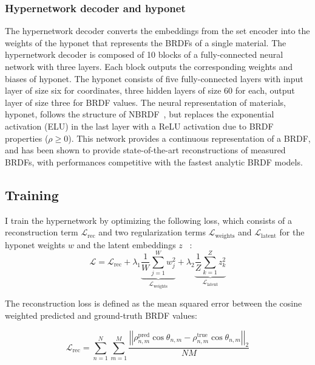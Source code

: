 \subsubsection{Hypernetwork decoder and hyponet} %
The hypernetwork decoder converts the embeddings from the set encoder into the weights of the hyponet that represents the \gls{BRDF}s of a single material. The hypernetwork decoder is composed of 10 blocks of a fully-connected neural network with three layers. Each block outputs the corresponding weights and biases of hyponet. The hyponet consists of five fully-connected layers with input layer of size six for coordinates, three hidden layers of size 60 for each, output layer of size three for \gls{BRDF} values. The neural representation of materials, hyponet, follows the structure of NBRDF~\cite{sztrajman2021neural}, but replaces the exponential activation (\gls{ELU}) in the last layer with a \gls{ReLU} activation due to \gls{BRDF} properties ($\rho \ge 0$). This network provides a continuous representation of a \gls{BRDF}, and has been shown to provide state-of-the-art reconstructions of measured \gls{BRDF}s, with performances competitive with the fastest analytic \gls{BRDF} models.


\subsection{Training}
\label{sec:traindet}


I train the hypernetwork by optimizing the following loss, which consists of a reconstruction term $\mathcal{L}_\text{rec}$ and two regularization terms $\mathcal{L}_\text{weights}$ and $\mathcal{L}_\text{latent}$ for the hyponet weights $w$ and the latent embeddings $z$ ~\cite{ha2017hypernetworks}:
\begin{equation}
    \mathcal{L} = \mathcal{L}_\text{rec} +
              \lambda_1 \underbrace{\frac{1}{W} \sum_{j=1}^W w^2_j}_{\mathcal{L}_\text{weights}} +
              \lambda_2 \underbrace{\frac{1}{Z} \sum_{k=1}^Z z^2_k}_{\mathcal{L}_\text{latent}}
    \label{eq:loss}
\end{equation}

The reconstruction loss is defined as the mean squared error between the cosine weighted predicted and ground-truth \gls{BRDF} values:

\begin{equation}
    \mathcal{L}_{\text{rec}} = \sum_{n=1}^{N}\sum_{m=1}^{M}\frac{\left|\left|\rho^{\text{pred}}_{n, m} \cos{\theta_{n, m}} - \rho^{\text{true}}_{n, m} \cos{\theta_{n, m}}\right|\right|_{2}}{NM}
    \label{eq:Lrec}
\end{equation}

